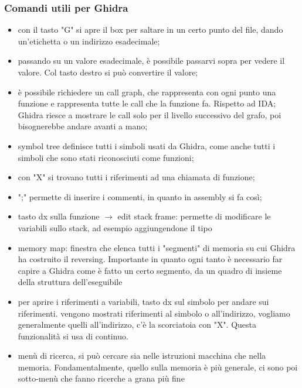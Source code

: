 \documentclass[12pt, oneside]{extbook}
\begin{document}
\subsubsection*{Comandi utili per Ghidra}
\begin{itemize}
\item con il tasto "G" si apre il box per saltare in un certo punto del file, dando un'etichetta o un indirizzo esadecimale;
\item passando su un valore esadecimale, è possibile passarvi sopra per vedere il valore. Col tasto destro si può convertire il valore;
\item è possibile richiedere un call graph, che rappresenta con ogni punto una funzione e rappresenta tutte le call che la funzione fa. Rispetto ad IDA; Ghidra riesce a mostrare le call solo per il livello successivo del grafo, poi bisognerebbe andare avanti a mano;
\item symbol tree definisce tutti i simboli usati da Ghidra, come anche tutti i simboli che sono stati riconosciuti come funzioni;
\item con "X" si trovano tutti i riferimenti ad una chiamata di funzione;
\item ";" permette di inserire i commenti, in quanto in assembly si fa così;
\item tasto dx sulla funzione $\rightarrow$ edit stack frame: permette di modificare le variabili sullo stack, ad esempio aggiungendone il tipo
\item memory map: finestra che elenca tutti i "segmenti" di memoria su cui Ghidra ha costruito il reversing. Importante in quanto ogni tanto è necessario far capire a Ghidra come è fatto un certo segmento, da un quadro di insieme della struttura dell'eseguibile
\item per aprire i riferimenti a variabili, tasto dx sul simbolo per andare sui riferimenti. vengono mostrati riferimenti al simbolo o all'indirizzo, vogliamo generalmente quelli all'indirizzo, c'è la scorciatoia con "X". Questa funzionalità si usa di continuo.
\item menù di ricerca, si può cercare sia nelle istruzioni macchina che nella memoria. Fondamentalmente, quello sulla memoria è più generale, ci sono poi sotto-menù che fanno ricerche a grana più fine
\end{itemize}
\end{document}
